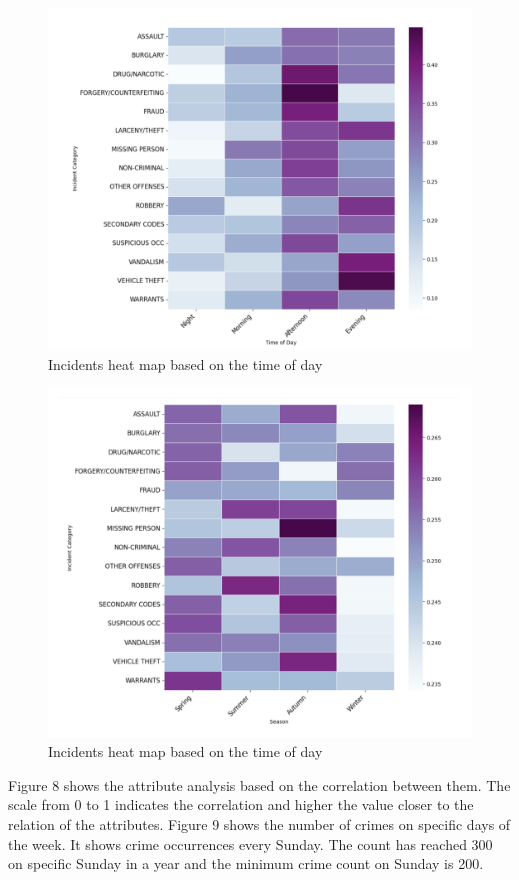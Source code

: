 \documentclass[11 pt,conference,final,]{IEEEtran}
\begin{document}
\begin{figure}

{\centering \includegraphics[width=0.7\linewidth]{img/fig6} 

}

\caption{Incidents heat map based on the time of day}\label{fig:unnamed-chunk-6}
\end{figure}

\begin{figure}

{\centering \includegraphics[width=0.7\linewidth]{img/fig7} 

}

\caption{Incidents heat map based on the time of day}\label{fig:unnamed-chunk-7}
\end{figure}

Figure 8 shows the attribute analysis based on the correlation between
them. The scale from 0 to 1 indicates the correlation and higher the
value closer to the relation of the attributes. Figure 9 shows the
number of crimes on specific days of the week. It shows crime
occurrences every Sunday. The count has reached 300 on specific Sunday
in a year and the minimum crime count on Sunday is 200.
\end{document}
